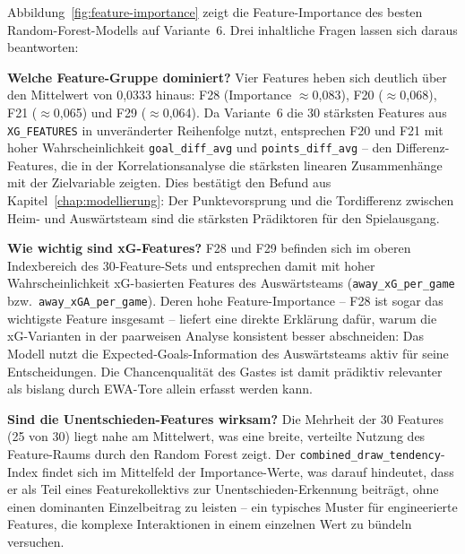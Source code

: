Abbildung~\ref{fig:feature-importance} zeigt die Feature-Importance des
besten Random-Forest-Modells auf Variante~6. Drei inhaltliche Fragen lassen
sich daraus beantworten:

\textbf{Welche Feature-Gruppe dominiert?} Vier Features heben sich deutlich
über den Mittelwert von 0,0333 hinaus: F28 (Importance $\approx$0,083),
F20 ($\approx$0,068), F21 ($\approx$0,065) und F29 ($\approx$0,064).
Da Variante~6 die 30 stärksten Features aus \texttt{XG\_FEATURES} in
unveränderter Reihenfolge nutzt, entsprechen F20 und F21 mit hoher
Wahrscheinlichkeit \texttt{goal\_diff\_avg} und \texttt{points\_diff\_avg}
-- den Differenz-Features, die in der Korrelationsanalyse die stärksten
linearen Zusammenhänge mit der Zielvariable zeigten. Dies bestätigt
den Befund aus Kapitel~\ref{chap:modellierung}: Der Punktevorsprung und
die Tordifferenz zwischen Heim- und Auswärtsteam sind die stärksten
Prädiktoren für den Spielausgang.

\textbf{Wie wichtig sind xG-Features?} F28 und F29 befinden sich im oberen
Indexbereich des 30-Feature-Sets und entsprechen damit mit hoher
Wahrscheinlichkeit xG-basierten Features des Auswärtsteams
(\texttt{away\_xG\_per\_game} bzw.\ \texttt{away\_xGA\_per\_game}).
Deren hohe Feature-Importance -- F28 ist sogar das wichtigste Feature
insgesamt -- liefert eine direkte Erklärung dafür, warum die xG-Varianten
in der paarweisen Analyse konsistent besser abschneiden: Das Modell
nutzt die Expected-Goals-Information des Auswärtsteams aktiv für
seine Entscheidungen. Die Chancenqualität des Gastes ist damit prädiktiv
relevanter als bislang durch EWA-Tore allein erfasst werden kann.

\textbf{Sind die Unentschieden-Features wirksam?} Die Mehrheit der 30
Features (25 von 30) liegt nahe am Mittelwert, was eine breite, verteilte
Nutzung des Feature-Raums durch den Random Forest zeigt. Der
\texttt{combined\_draw\_tendency}-Index findet sich im Mittelfeld der
Importance-Werte, was darauf hindeutet, dass er als Teil eines
Featurekollektivs zur Unentschieden-Erkennung beiträgt, ohne einen
dominanten Einzelbeitrag zu leisten -- ein typisches Muster für
engineerierte Features, die komplexe Interaktionen in einem einzelnen
Wert zu bündeln versuchen.

